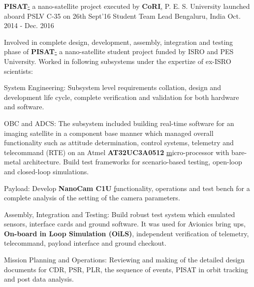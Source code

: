 
\begin{cventries}
	\cventry
	{\textbf{\large PISAT}\href{http://pisat.pes.edu/}- a nano-satellite project executed by \textbf{\large CoRI}\href{http://cori.pes.edu/}, P. E. S. University launched aboard PSLV C-35 on 26th Sept'16}
	{\large Student Team Lead}
	{\large Bengaluru, India}
	{\large Oct. 2014 - Dec. 2016}
	{
		\begin{cvitems}
		\item{\large Involved in complete design, development, assembly, integration and testing phase of \textbf{PISAT}\href{https://www.isro.gov.in/Spacecraft/pisat} - a nano-satellite student project funded by ISRO and PES University. Worked in following subsystems under the expertize of ex-ISRO scientists:}
		\item{\large System Engineering: Subsystem level requirements collation, design and development life cycle, complete verification and validation for both hardware and software.}
		\item{\large OBC and ADCS: The subsystem included building real-time software for an imaging satellite in a component base manner which managed overall functionality such as attitude determination, control systems, telemetry and telecommand (RTE) on an Atmel \textbf{AT32UC3A0512 }\href{https://www.microchip.com/wwwproducts/en/AT32UC3A0512} micro-processor with bare-metal architecture. Build test frameworks for scenario-based testing, open-loop and closed-loop simulations.}
		\item{\large Payload: Develop \textbf{NanoCam C1U }\href{https://gomspace.com/UserFiles/Subsystems/datasheet/gs-ds-nanocam-c1u-17.pdf} functionality, operations and test bench for a complete analysis of the setting of the camera parameters.}
		\item{\large Assembly, Integration and Testing: Build robust test system which emulated sensors, interface cards and ground software. It was used for Avionics bring ups, \textbf{On-board in Loop Simulation (OiLS)}, independent verification of telemetry, telecommand, payload interface and ground checkout.}
		\item{\large Mission Planning and Operations: Reviewing and making of the detailed design documents for CDR, PSR, PLR, the sequence of events, PISAT in orbit tracking and post data analysis.}
		\end{cvitems}
	}
\end{cventries}
